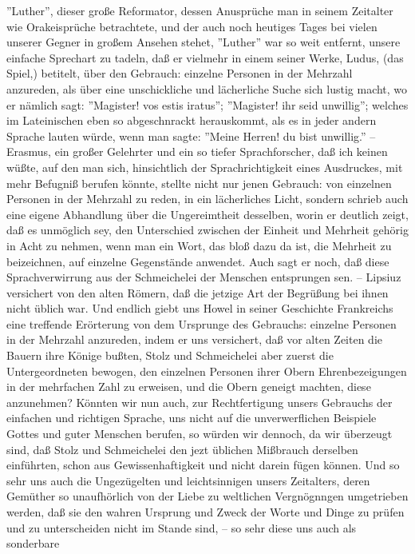 ''Luther'', dieser große Reformator, dessen Anusprüche man in seinem Zeitalter
wie Orakeisprüche betrachtete, und der auch noch heutiges Tages bei vielen
unserer Gegner in großem Ansehen stehet, ''Luther'' war so weit entfernt, unsere
einfache Sprechart zu tadeln, daß er vielmehr in einem seiner Werke, Ludus, (das
Spiel,) betitelt, über den Gebrauch: einzelne Personen in der Mehrzahl
anzureden, als über eine unschickliche und lächerliche Suche sich lustig macht,
wo er nämlich sagt: ''Magister! vos estis iratus''; ''Magister! ihr seid
unwillig''; welches im Lateinischen eben so abgeschnrackt herauskommt, als es in
jeder andern Sprache lauten würde, wenn man sagte: ''Meine Herren! du bist
unwillig.'' -- Erasmus, ein großer Gelehrter und ein so tiefer Sprachforscher,
daß ich keinen wüßte, auf den man sich, hinsichtlich der Sprachrichtigkeit eines
Ausdruckes, mit mehr Befugniß berufen könnte, stellte nicht nur jenen Gebrauch:
von einzelnen Personen in der Mehrzahl zu reden, in ein lächerliches Licht,
sondern schrieb auch eine eigene Abhandlung über die Ungereimtheit desselben,
worin er deutlich zeigt, daß es unmöglich sey, den Unterschied zwischen der
Einheit und Mehrheit gehörig in Acht zu nehmen, wenn man ein Wort, das bloß dazu
da ist, die Mehrheit zu beizeichnen, auf einzelne Gegenstände anwendet. Auch
sagt er noch, daß diese Sprachverwirrung aus der Schmeichelei der Menschen
entsprungen sen. -- Lipsiuz versichert von den alten Römern, daß die jetzige Art
der Begrüßung bei ihnen nicht üblich war. Und endlich giebt uns Howel in seiner
Geschichte Frankreichs eine treffende Erörterung von dem Ursprunge des
Gebrauchs: einzelne Personen in der Mehrzahl anzureden, indem er uns versichert,
daß vor alten Zeiten die Bauern ihre Könige bußten, Stolz und Schmeichelei aber
zuerst die Untergeordneten bewogen, den einzelnen Personen ihrer Obern
Ehrenbezeigungen in der mehrfachen Zahl zu erweisen, und die Obern geneigt
machten, diese anzunehmen? Könnten wir nun auch, zur Rechtfertigung unsers
Gebrauchs der einfachen und richtigen Sprache, uns nicht auf die unverwerflichen
Beispiele Gottes und guter Menschen berufen, so würden wir dennoch, da wir
überzeugt sind, daß Stolz und Schmeichelei den jezt üblichen Mißbrauch derselben
einführten, schon aus Gewissenhaftigkeit und nicht darein fügen können. Und so
sehr uns auch die Ungezügelten und leichtsinnigen unsers Zeitalters, deren
Gemüther so unaufhörlich von der Liebe zu weltlichen Vergnögnngen umgetrieben
werden, daß sie den wahren Ursprung und Zweck der Worte und Dinge zu prüfen und
zu unterscheiden nicht im Stande sind, -- so sehr diese uns auch als sonderbare
